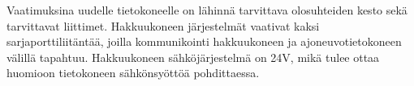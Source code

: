 Vaatimuksina uudelle tietokoneelle on lähinnä tarvittava olosuhteiden kesto sekä tarvittavat liittimet. Hakkuukoneen järjestelmät vaativat kaksi sarjaporttiliitäntää, joilla kommunikointi hakkuukoneen ja ajoneuvotietokoneen välillä tapahtuu. Hakkuukoneen sähköjärjestelmä on 24V, mikä tulee ottaa huomioon tietokoneen sähkönsyöttöä pohdittaessa.

\lipsum[12-14]








